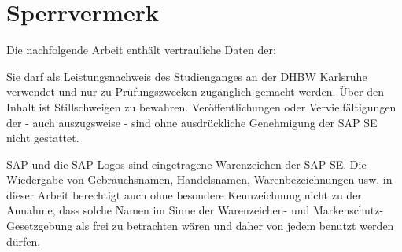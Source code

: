 \chapter*{Sperrvermerk}
Die nachfolgende Arbeit enthält vertrauliche Daten der:
\begin{quote}
\end{quote}

\vspace{0.5cm}

Sie darf als Leistungsnachweis des Studienganges \studiengang{} \studienjahr{} an der DHBW Karlsruhe verwendet und nur zu Prüfungszwecken zugänglich gemacht werden. Über den Inhalt ist Stillschweigen zu bewahren. Veröffentlichungen oder Vervielfältigungen der \arbeit{} - auch auszugsweise - sind ohne ausdrückliche Genehmigung der SAP SE nicht gestattet.

\vspace{0.5cm}

SAP und die SAP Logos sind eingetragene Warenzeichen der SAP SE.
Die Wiedergabe von Gebrauchsnamen, Handelsnamen, Warenbezeichnungen usw. in dieser Arbeit berechtigt auch ohne besondere Kennzeichnung nicht zu der Annahme, dass solche Namen im Sinne der Warenzeichen- und Markenschutz-Gesetzgebung als frei zu betrachten wären und daher von jedem benutzt werden dürfen.
